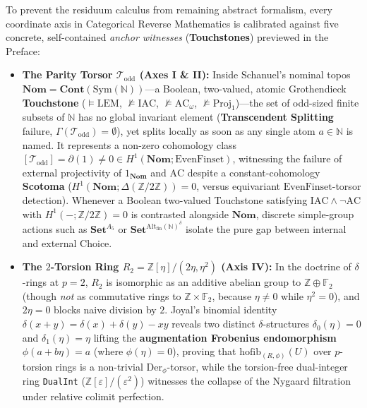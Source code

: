 \begin{remark}\label{rem:anchor-witnesses}
To prevent the residuum calculus from remaining abstract formalism, every coordinate axis in Categorical Reverse Mathematics is calibrated against five concrete, self-contained \emph{anchor witnesses} (\textbf{Touchstones}) previewed in the Preface:
\begin{itemize}
  \item \textbf{The Parity Torsor $\mathcal{T}_{\mathrm{odd}}$ (Axes I \& II):} Inside Schanuel's nominal topos $\mathbf{Nom} = \mathbf{Cont}(\mathrm{Sym}(\mathbb{N}))$---a Boolean, two-valued, atomic Grothendieck \textbf{Touchstone} ($\models \mathrm{LEM}$, $\not\models \mathrm{IAC}$, $\not\models \mathrm{AC}_\omega$, $\not\models \mathrm{Proj}_1$)---the set of odd-sized finite subsets of $\mathbb{N}$ has no global invariant element (\textbf{Transcendent Splitting} failure, $\Gamma(\mathcal{T}_{\mathrm{odd}}) = \emptyset$), yet splits locally as soon as any single atom $a \in \mathbb{N}$ is named. It represents a non-zero cohomology class $[\mathcal{T}_{\mathrm{odd}}] = \partial(1) \neq 0 \in H^1(\mathbf{Nom}; \mathrm{EvenFinset})$, witnessing the failure of external projectivity of $1_{\mathbf{Nom}}$ and $\mathrm{AC}$ despite a constant-cohomology \textbf{Scotoma} ($H^1(\mathbf{Nom}; \Delta(\mathbb{Z}/2\mathbb{Z})) = 0$, versus equivariant $\mathrm{EvenFinset}$-torsor detection). Whenever a Boolean two-valued Touchstone satisfying $\mathrm{IAC} \wedge \neg\mathrm{AC}$ with $H^1(-; \mathbb{Z}/2\mathbb{Z}) = 0$ is contrasted alongside $\mathbf{Nom}$, discrete simple-group actions such as $\mathbf{Set}^{A_5}$ or $\mathbf{Set}^{\mathrm{Alt}_{\mathrm{fin}}(\mathbb{N})^\delta}$ isolate the pure gap between internal and external Choice.
  \item \textbf{The $2$-Torsion Ring $R_2 = \mathbb{Z}[\eta]/(2\eta, \eta^2)$ (Axis IV):} In the doctrine of $\delta$-rings at $p = 2$, $R_2$ is isomorphic as an additive abelian group to $\mathbb{Z} \oplus \mathbb{F}_2$ (though \emph{not} as commutative rings to $\mathbb{Z} \times \mathbb{F}_2$, because $\eta \neq 0$ while $\eta^2 = 0$), and $2\eta = 0$ blocks naive division by $2$. Joyal's binomial identity $\delta(x + y) = \delta(x) + \delta(y) - xy$ reveals two distinct $\delta$-structures $\delta_0(\eta) = 0$ and $\delta_1(\eta) = \eta$ lifting the \textbf{augmentation Frobenius endomorphism} $\phi(a + b\eta) = a$ (where $\phi(\eta) = 0$), proving that $\mathrm{hofib}_{(R,\phi)}(U)$ over $p$-torsion rings is a non-trivial $\mathrm{Der}_\phi$-torsor, while the torsion-free dual-integer ring \texttt{DualInt} ($\mathbb{Z}[\varepsilon]/(\varepsilon^2)$) witnesses the collapse of the Nygaard filtration under relative colimit perfection.

\end{itemize}
\end{remark}
